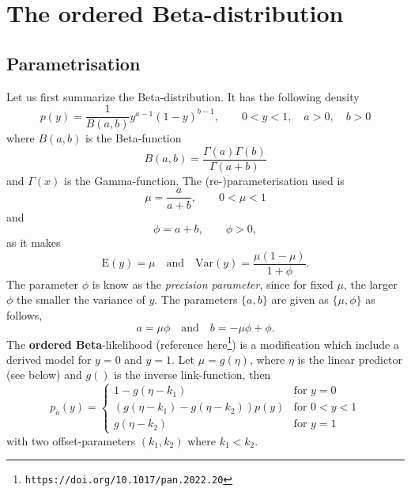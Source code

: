 \documentclass[a4paper,11pt]{article}
\begin{document}
\section*{The ordered Beta-distribution}

\subsection*{Parametrisation}

Let us first summarize the Beta-distribution. It has the following density
\begin{displaymath}
    p(y) = \frac{1}{B(a, b)} y^{a-1}(1-y)^{b-1}, \qquad 0 < y < 1,
    \quad a>0, \quad b > 0
\end{displaymath}
where $B(a, b)$
is the Beta-function 
\begin{displaymath}
    B(a, b) = \frac{\Gamma(a)\Gamma(b)}{\Gamma(a+b)}
\end{displaymath}
and $\Gamma(x)$ is the Gamma-function.
The (re-)parameterisation used is
\begin{displaymath}
    \mu = \frac{a}{a+b}, \qquad 0 < \mu < 1
\end{displaymath}
and
\begin{displaymath}
    \phi = a + b, \qquad \phi > 0,
\end{displaymath}
as it makes
\begin{displaymath}
    \text{E}(y) = \mu \quad\text{and}\quad \text{Var}(y) = \frac{\mu(1-\mu)}{1+\phi}.
\end{displaymath}
The parameter $\phi$ is know as the \emph{precision parameter}, since
for fixed $\mu$, the larger $\phi$ the smaller the variance of $y$.
The parameters $\{a, b\}$ are given as $\{\mu, \phi\}$ as follows,
\begin{displaymath}
    a = \mu \phi \quad\text{and}\quad  b = -\mu \phi + \phi.
\end{displaymath}
The \textbf{ordered Beta}-likelihood (reference
here\footnote{\texttt{https://doi.org/10.1017/pan.2022.20}}) is a
modification which include a derived model for $y=0$ and $y=1$. Let
$\mu = g(\eta)$, where $\eta$ is the linear predictor (see below) and
$g()$ is the inverse link-function, then
\begin{displaymath}
    p_o(y) = \left\{\begin{array}{ll}
      1-g(\eta - k_1) & \text{for } y=0\\
      (g(\eta-k_1) - g(\eta-k_2)) p(y) & \text{for } 0 < y < 1\\
      g(\eta - k_2) & \text{for } y=1
        \end{array}\right.
\end{displaymath}
with two offset-parameters $(k_1, k_2)$ where $k_1 < k_2$.
\end{document}
